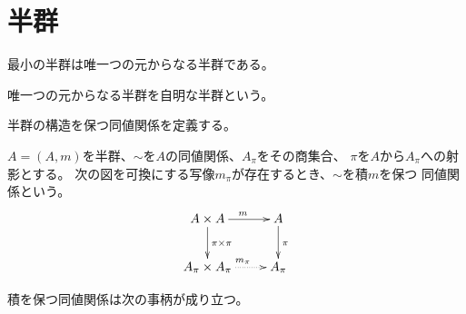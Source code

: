 \section{半群}\label{s1:半群} %
	最小の半群は唯一つの元からなる半群である。

	\begin{definition}[自明な半群]\label{def:自明な半群} %
		唯一つの元からなる半群を自明な半群という。
	\end{definition} %

	半群の構造を保つ同値関係を定義する。

	\begin{definition}[積を保つ同値関係]\label{def:積を保つ同値関係} %
		$A=(A,m)$を半群、$\sim$を$A$の同値関係、$A_{\pi}$をその商集合、
		$\pi$を$A$から$A_{\pi}$への射影とする。
		次の図を可換にする写像$m_{\pi}$が存在するとき、$\sim$を積$m$を保つ
		同値関係という。
		\begin{equation}\label{eq:積を保つ同値関係}\xymatrix{
			A\times A \ar[r]^{m} \ar[d]^{\pi\times \pi} & A \ar[d]^{\pi} \\
			A_{\pi}\times A_{\pi} \ar@{.>}[r]^{m_{\pi}} & A_{\pi} \\
		}\end{equation}
	\end{definition} %

	積を保つ同値関係は次の事柄が成り立つ。

